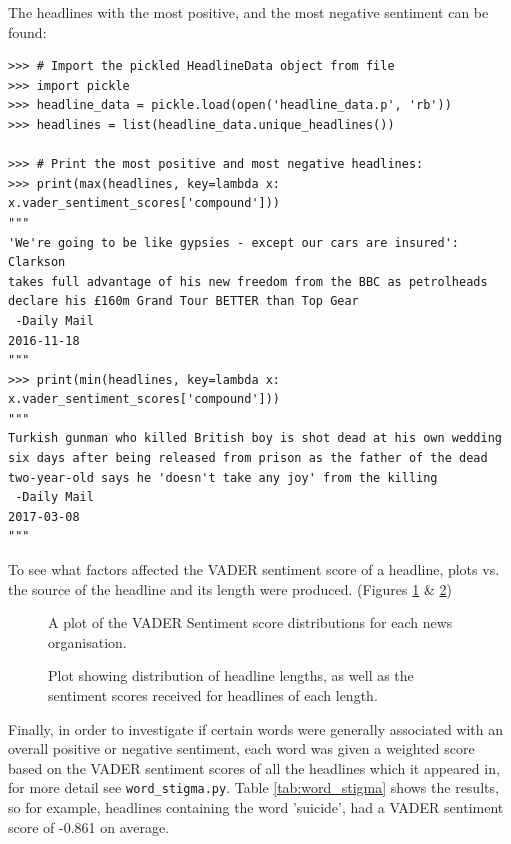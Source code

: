 \documentclass[a4paper,12pt]{article}
\begin{document}
\noindent
The headlines with the most positive, and the most negative sentiment can be found:
\begin{verbatim}
>>> # Import the pickled HeadlineData object from file
>>> import pickle
>>> headline_data = pickle.load(open('headline_data.p', 'rb'))
>>> headlines = list(headline_data.unique_headlines())

>>> # Print the most positive and most negative headlines:
>>> print(max(headlines, key=lambda x: x.vader_sentiment_scores['compound']))
"""
'We're going to be like gypsies - except our cars are insured': Clarkson 
takes full advantage of his new freedom from the BBC as petrolheads 
declare his £160m Grand Tour BETTER than Top Gear
 -Daily Mail
2016-11-18
"""
>>> print(min(headlines, key=lambda x: x.vader_sentiment_scores['compound']))
"""
Turkish gunman who killed British boy is shot dead at his own wedding 
six days after being released from prison as the father of the dead
two-year-old says he 'doesn't take any joy' from the killing
 -Daily Mail
2017-03-08
"""
\end{verbatim}


\noindent
To see what factors affected the VADER sentiment score of a headline, plots vs. the source of the headline and its length were produced. (Figures \ref{fig:score_vs_organisation} \& \ref{fig:score_vs_length})

\begin{figure}[H]
    \centering
    
    \caption{A plot of the VADER Sentiment score distributions for each news organisation.}
    \label{fig:score_vs_organisation}
\end{figure}

\begin{figure}[H]
    \centering
    
    \caption{Plot showing distribution of headline lengths, as well as the sentiment scores received for headlines of each length.}
    \label{fig:score_vs_length}
\end{figure}

Finally, in order to investigate if certain words were generally associated with an overall positive or negative sentiment, each word was given a weighted score based on the VADER sentiment scores of all the headlines which it appeared in, for more detail see \texttt{word\_stigma.py}.
Table \ref{tab:word_stigma} shows the results, so for example, headlines containing the word 'suicide', had a VADER sentiment score of -0.861 on average.
\end{document}
